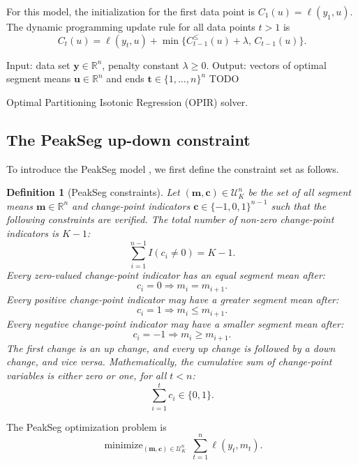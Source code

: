 \documentclass{article}
\newtheorem{definition}{Definition}
\DeclareMathOperator*{\minimize}{minimize}
\newcommand{\RR}{\mathbb R}
\begin{document}
For this model, the initialization for the first data point is
$C_1(u) = \ell(y_1, u)$. The dynamic programming update rule for all data points $t>1$ is
\begin{equation}
  C_t(u) = \ell(y_t, u) + \min\{
  C_{t-1}^\leq(u) + \lambda,\, C_{t-1}(u)
  \}.
\end{equation}

\begin{algorithm}[H]
\begin{algorithmic}[1]
\STATE Input: data set $\mathbf y\in\RR^n$, penalty constant $\lambda\geq 0$.
\STATE Output: vectors of optimal segment means $\mathbf u\in\RR^{n}$ and ends $\mathbf t\in\{1,\dots,n\}^{n}$
\STATE TODO
\caption{\label{algo:OPIR}Optimal Partitioning Isotonic Regression (OPIR) solver.}
\end{algorithmic}
\end{algorithm}

\subsection{The PeakSeg up-down constraint}
\label{sec:PeakSeg}

To introduce the PeakSeg model \citep{HOCKING-PeakSeg}, we first
define the constraint set as follows.
\begin{definition}[PeakSeg constraints]
  \label{def:U}
  Let $(\mathbf m, \mathbf c)\in\mathcal U_K^n$ be the set of all segment means
  $\mathbf m\in\RR^n$ and change-point indicators
  $\mathbf c\in\{-1, 0,1\}^{n-1}$ such that the following constraints are
  verified. The total number of non-zero change-point indicators is $K-1$:
  \begin{equation}
    \label{eq:U_segments}
    \sum_{i=1}^{n-1} I(c_i \neq 0) = K-1.
  \end{equation}
  Every zero-valued change-point indicator has an equal segment mean
  after:
  \begin{equation}
    \label{eq:U_0}
    c_i = 0 \Rightarrow m_i = m_{i+1}.
  \end{equation}
  Every positive change-point indicator may have a greater segment
  mean after:
  \begin{equation}
    \label{eq:U_1}
    c_i = 1 \Rightarrow m_i \leq m_{i+1}.
  \end{equation}
  Every negative change-point indicator may have a smaller segment
  mean after:
  \begin{equation}
    \label{eq:U-1}
    c_i = -1 \Rightarrow m_i \geq m_{i+1}.
  \end{equation}
  The first change is an up change, and every up change is followed by a
  down change, and vice versa. Mathematically, the cumulative sum of
  change-point variables is either zero or one, for all $t<n$:
  \begin{equation}
    \label{eq:U-cum}
    \sum_{i=1}^t c_i \in \{0, 1\}.
  \end{equation}
\end{definition}
The PeakSeg optimization problem is
\begin{equation}
\label{eq:min_PeakSeg}
    \minimize_{
        (\mathbf m, \mathbf c)\in\mathcal U^n_K
      } \ 
\sum_{t=1}^n \ell(y_t, m_t).
\end{equation}
\end{document}
